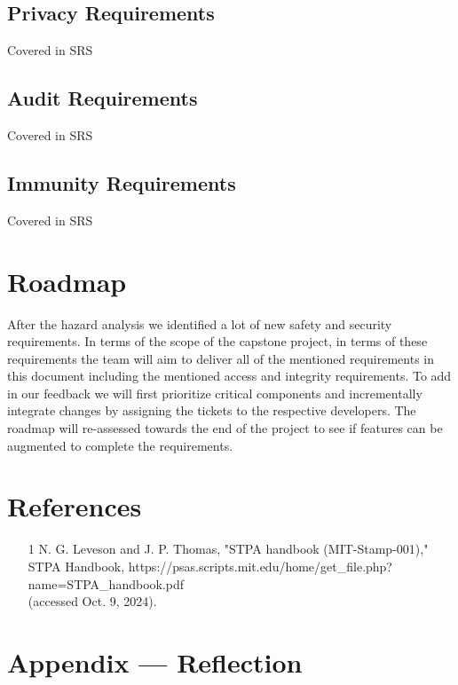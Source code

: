 \documentclass{article}
\begin{document}
\subsection{Privacy Requirements}
Covered in SRS

\subsection{Audit Requirements}
Covered in SRS

\subsection{Immunity Requirements}
Covered in SRS

\section{Roadmap}


After the hazard analysis we identified a lot of new safety and security requirements. In terms of the scope of the capstone project, in terms of these requirements the team will aim to deliver all of the mentioned requirements in this document including the mentioned access and integrity requirements. To add in our feedback we will first prioritize critical components and incrementally integrate changes by assigning the tickets to the respective developers. The roadmap will re-assessed towards the end of the project to see if features can be augmented to complete the requirements.


\newpage{}

\section{References}

\begin{itemize}
    \item [1] N. G. Leveson and J. P. Thomas, "STPA handbook (MIT-Stamp-001)," STPA Handbook,
    https://psas.scripts.mit.edu/home/get_file.php?name=STPA_handbook.pdf \\
    (accessed Oct. 9, 2024).
\end{itemize}

\newpage{}

\section*{Appendix --- Reflection}
\end{document}
